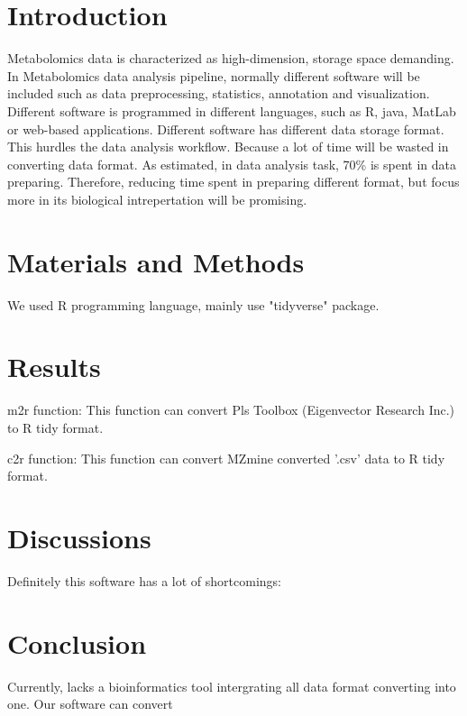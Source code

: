 \section{Introduction}
Metabolomics data is characterized as high-dimension, storage space demanding.
In Metabolomics data analysis pipeline, normally different software will be included such as data preprocessing, statistics, annotation and visualization. Different software is programmed in different languages, such as R, java, MatLab or web-based applications.
Different software has different data storage format. This hurdles the data analysis workflow. Because a lot of time will be wasted in converting data format.
As estimated, in data analysis task, 70\% is spent in data preparing.
Therefore, reducing time spent in preparing different format, but focus more in its biological intrepertation will be promising.

\section{Materials and Methods}
We used R programming language, mainly use "tidyverse" package.

\section{Results}
m2r function: This function can convert Pls Toolbox (Eigenvector Research Inc.) to R tidy format.

c2r function: This function can convert MZmine converted '.csv' data to R tidy format.

\section{Discussions}
Definitely this software has a lot of shortcomings: 

\section{Conclusion}
Currently, lacks a bioinformatics tool intergrating all data format converting into one.
Our software can convert
